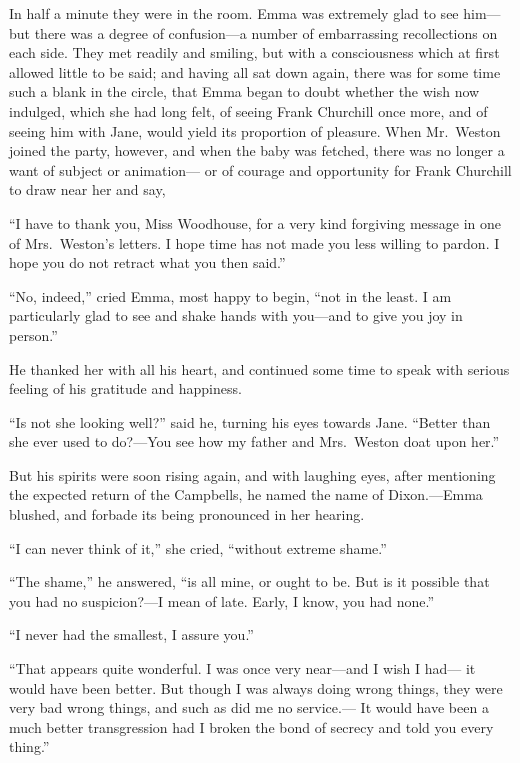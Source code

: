 In half a minute they were in the room.  Emma was extremely glad
to see him---but there was a degree of confusion---a number of
embarrassing recollections on each side.  They met readily and smiling,
but with a consciousness which at first allowed little to be said;
and having all sat down again, there was for some time such a blank
in the circle, that Emma began to doubt whether the wish now indulged,
which she had long felt, of seeing Frank Churchill once more,
and of seeing him with Jane, would yield its proportion of pleasure.
When Mr.\ Weston joined the party, however, and when the baby
was fetched, there was no longer a want of subject or animation---%
or of courage and opportunity for Frank Churchill to draw near her
and say,

``I have to thank you, Miss Woodhouse, for a very kind forgiving
message in one of Mrs.\ Weston's letters.  I hope time has not made
you less willing to pardon.  I hope you do not retract what you
then said.''

``No, indeed,'' cried Emma, most happy to begin, ``not in the least.
I am particularly glad to see and shake hands with you---and to give
you joy in person.''

He thanked her with all his heart, and continued some time to speak
with serious feeling of his gratitude and happiness.

``Is not she looking well?'' said he, turning his eyes towards Jane.
``Better than she ever used to do?---You see how my father and
Mrs.\ Weston doat upon her.''

But his spirits were soon rising again, and with laughing eyes,
after mentioning the expected return of the Campbells, he named
the name of Dixon.---Emma blushed, and forbade its being pronounced
in her hearing.

``I can never think of it,'' she cried, ``without extreme shame.''

``The shame,'' he answered, ``is all mine, or ought to be.  But is it
possible that you had no suspicion?---I mean of late.  Early, I know,
you had none.''

``I never had the smallest, I assure you.''

``That appears quite wonderful.  I was once very near---and I wish I had---%
it would have been better.  But though I was always doing wrong things,
they were very bad wrong things, and such as did me no service.---%
It would have been a much better transgression had I broken the bond
of secrecy and told you every thing.''

